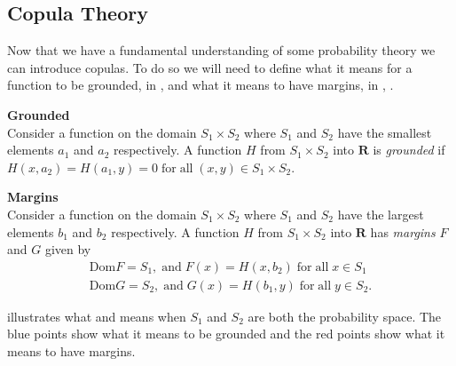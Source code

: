 \subsection{Copula Theory}\label{sec:CopulaTheory}
Now that we have a fundamental understanding of some probability theory we can introduce copulas. To do so we will need to define what it means for a function to be grounded, in , and what it means to have margins, in , \citet[p.~9]{Nelsen2006}.

\begin{definition}\label{def:grounded}\textbf{Grounded} \\
    Consider a function on the domain $S_1\times S_2$ where $S_1$ and $S_2$ have the smallest elements $a_1$ and $a_2$ respectively. A function $H$ from $S_1\times S_2$ into $\mathbf{R}$ is \emph{grounded} if $H(x,a_2)= H(a_1,y) = 0 \;\mathrm{for \;all\;} (x,y) \in S_1\times S_2.$
\end{definition}

\begin{definition}\label{def:margins}
    \textbf{Margins}\\
    Consider a function on the domain $S_1\times S_2$ where $S_1$ and $S_2$ have the largest elements $b_1$ and $b_2$ respectively. A function $H$ from $S_1\times S_2$ into $\mathbf{R}$ has \emph{margins} $F$ and $G$ given by
    \begin{align*}
        \mathrm{Dom}F = S_1, \;\mathrm{and }\; F(x) = H(x,b_2) \;\mathrm{for \;all\;} x \in S_1\\
        \mathrm{Dom}G = S_2, \;\mathrm{and }\; G(x) = H(b_1,y) \;\mathrm{for \;all\;} y \in S_2.
    \end{align*}
\end{definition}

 illustrates what  and  means when $S_1$ and $S_2$ are both the probability space. The blue points show what it means to be grounded and the red points show what it means to have margins. 

